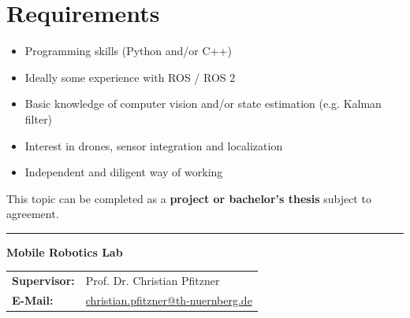 \documentclass{ohm_project_description}
\begin{document}
\section*{Requirements}
\begin{itemize}[leftmargin=0.5cm]
    \setlength\itemsep{.1em}
    \item Programming skills (Python and/or C++)
    \item Ideally some experience with ROS / ROS 2
    \item Basic knowledge of computer vision and/or state estimation (e.g. Kalman filter)
    \item Interest in drones, sensor integration and localization
    \item Independent and diligent way of working
\end{itemize}

\vspace{0.5cm}
This topic can be completed as a \textbf{project or bachelor's thesis} subject to agreement.

\vfill
\textcolor{ohm_red}{\rule{\linewidth}{0.4mm}}
\textbf{\textcolor{ohm_red}{Mobile Robotics Lab}} \\
\begin{tabular}{@{}ll}
\textbf{Supervisor:} & Prof. Dr. Christian Pfitzner \\
\textbf{E-Mail:}     & \href{mailto:christian.pfitzner@th-nuernberg.de}{christian.pfitzner@th-nuernberg.de} \\
\end{tabular}
\end{document}
